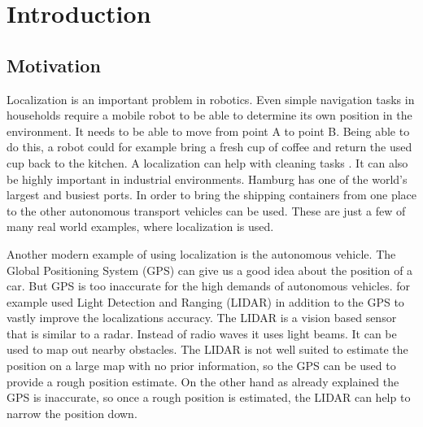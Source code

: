 \chapter{Introduction} %
\label{Chapter1}

\section{Motivation}
Localization is an important problem in robotics. Even simple navigation tasks in households require a mobile robot to be able to determine its own position in the environment. It needs to be able to move from point A to point B. Being able to do this, a robot could for example bring a fresh cup of coffee and return the used cup back to the kitchen. A localization can help with cleaning tasks \citep{pinheiro2015cleaning}. It can also be highly important in industrial environments. Hamburg has one of the world's largest and busiest ports. In order to bring the shipping containers from one place to the other autonomous transport vehicles can be used. These are just a few of many real world examples, where localization is used.

Another modern example of using localization is the autonomous vehicle. The Global Positioning System (\Gls{GPS}) \citep{misra2006global} can give us a good idea about the position of a car. But \Gls{GPS} is too inaccurate for the high demands of autonomous vehicles. \citet{DBLP:conf/rss/LevinsonMT07} for example used Light Detection and Ranging (\Gls{LIDAR}) \citep{Lidar} in addition to the \Gls{GPS} to vastly improve the localizations accuracy. The \Gls{LIDAR} is a vision based sensor that is similar to a radar. Instead of radio waves it uses light beams. It can be used to map out nearby obstacles. The \Gls{LIDAR} is not well suited to estimate the position on a large map with no prior information, so the \Gls{GPS} can be used to provide a rough position estimate. On the other hand as already explained the \Gls{GPS} is inaccurate, so once a rough position is estimated, the \Gls{LIDAR} can help to narrow the position down. 

